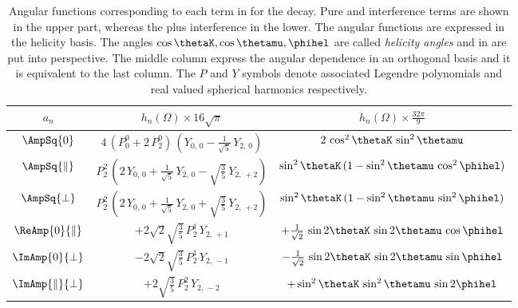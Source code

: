 \begin{table}[!h]
  \centering
  \caption{ Angular functions corresponding to each term in  for the \BJpsiKst decay. Pure and interference \pwave terms are shown in the upper part,
    whereas the \swave plus \spwave interference in the lower. The angular functions are expressed in the helicity basis. The angles $\cos\thetaK,\cos\thetamu,\phihel$
    are called \emph{helicity angles} and in  are put into perspective. The middle column express the angular dependence in an orthogonal basis and it
    is equivalent to the last column. The $P$ and $Y$ symbols denote associated Legendre polynomials and real valued spherical harmonics
    respectively. }
  \renewcommand{\arraystretch}{1.2}
  \label{ang_distr}
  \begin{tabular}{ccc}
    \hline
    $a_n$                             &
      $h_n(\Omega) \times 16\sqrt{\pi}$      &
      $h_n(\Omega) \times \tfrac{32\pi}{9}$  \\

    \hline
    $\AmpSq{0}$  &
      $4\, (P_0^0 + 2\, P_2^0)\, (Y_{0,\,0} - \tfrac{1}{\sqrt{5}}\, Y_{2,\,0})$  &
      $2\, \cos^2\thetaK\, \sin^2\thetamu$  \\

    $\AmpSq{\parallel}$  &
      $P_2^2\, (2\, Y_{0,\,0} + \tfrac{1}{\sqrt{5}}\, Y_{2,\,0} - \sqrt{\tfrac{3}{5}}\, Y_{2,\,+2})$  &
      $\sin^2\thetaK\, (1 - \sin^2\thetamu\, \cos^2\phihel)$  \\

    $\AmpSq{\perp}$  &
      $P_2^2\, (2\, Y_{0,\,0} + \tfrac{1}{\sqrt{5}}\, Y_{2,\,0} + \sqrt{\tfrac{3}{5}}\, Y_{2,\,+2})$  &
      $\sin^2\thetaK\, (1 - \sin^2\thetamu\, \sin^2\phihel)$  \\

    $\ReAmp{0}{\parallel}$  &
      $+2\sqrt{2}\sqrt{\tfrac{3}{5}}\, P_2^1\, Y_{2,\,+1}$  &
      $+\frac{1}{\sqrt{2}}\, \sin2\thetaK\, \sin2\thetamu\, \cos\phihel$  \\

    $\ImAmp{0}{\perp}$  &
      $-2\sqrt{2}\sqrt{\tfrac{3}{5}}\, P_2^1\, Y_{2,\,-1}$  &
      $-\frac{1}{\sqrt{2}}\, \sin2\thetaK\, \sin2\thetamu\, \sin\phihel$  \\


    $\ImAmp{\parallel}{\perp}$  &
      $+2\sqrt{\tfrac{3}{5}}\, P_2^2\, Y_{2,\,-2}$  &
      $+\sin^2\thetaK\, \sin^2\thetamu\, \sin2\phihel$  \\


\end{tabular}
\end{table}
